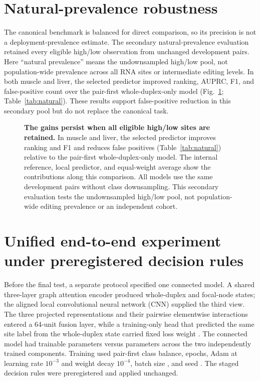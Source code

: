 \documentclass[9pt,twoside]{pnas-new}
\begin{document}
\section{Natural-prevalence robustness}\label{si:natural-prevalence}

The canonical benchmark is balanced for direct comparison, so its precision is not a deployment-prevalence estimate. The secondary natural-prevalence evaluation retained every eligible high/low observation from unchanged development pairs. Here ``natural prevalence'' means the undownsampled high/low pool, not population-wide prevalence across all RNA sites or intermediate editing levels. In both muscle and liver, the selected predictor improved ranking, AUPRC, F1, and false-positive count over the pair-first whole-duplex-only model (Fig.~\ref{fig:s3}; Table~\ref{tab:natural}). These results support false-positive reduction in this secondary pool but do not replace the canonical task.

\begin{figure}[H]
\centering

\caption{\textbf{The gains persist when all eligible high/low sites are retained.} In muscle and liver, the selected predictor improves ranking and F1 and reduces false positives (Table~\ref{tab:natural}) relative to the pair-first whole-duplex-only model. The internal reference, local predictor, and equal-weight average show the contributions along this comparison. All models use the same development pairs without class downsampling. This secondary evaluation tests the undownsampled high/low pool, not population-wide editing prevalence or an independent cohort.}
\label{fig:s3}
\end{figure}



\section{Unified end-to-end experiment under preregistered decision rules}\label{si:unified}

Before the final test, a separate protocol specified one connected model. A shared three-layer graph attention encoder produced whole-duplex and focal-node states; the aligned local convolutional neural network (CNN) supplied the third view. The three projected representations and their pairwise elementwise interactions entered a 64-unit fusion layer, while a training-only head that predicted the same site label from the whole-duplex state carried fixed loss weight \UnifiedAuxWeight{}. The connected model had \UnifiedParameters{} trainable parameters versus \EnsembleParameters{} parameters across the two independently trained components. Training used pair-first class balance, \UnifiedEpochs{} epochs, Adam at learning rate $10^{-3}$ and weight decay $10^{-4}$, batch size \UnifiedBatchSize{}, and seed \UnifiedBaseSeed{}. The staged decision rules were preregistered and applied unchanged.
\end{document}
